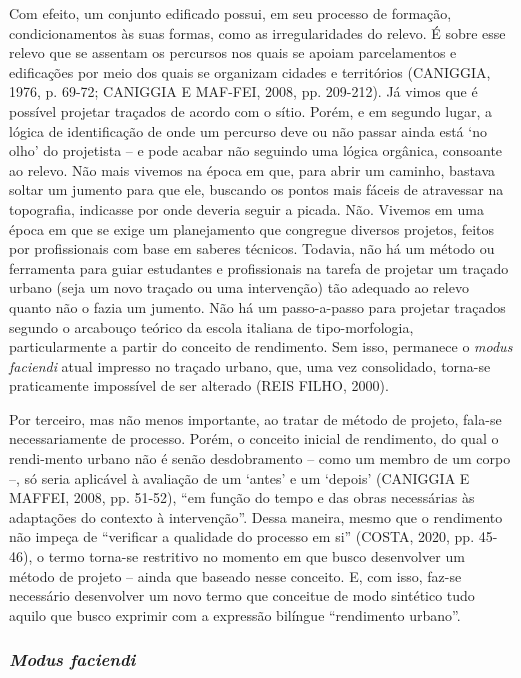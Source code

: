 \documentclass[twoside, 12pt]{book}
\begin{document}
        Com efeito, um conjunto edificado possui, em seu processo de formação, condicionamentos às suas formas, como as irregularidades do relevo. É sobre esse relevo que se assentam os percursos nos quais se apoiam parcelamentos e edificações por meio dos quais se organizam cidades e territórios (CANIGGIA, 1976, p. 69-72; CANIGGIA E MAF-FEI, 2008, pp. 209-212). Já vimos que é possível projetar traçados de acordo com o sítio. Porém, e em segundo lugar, a lógica de identificação de onde um percurso deve ou não passar ainda está ‘no olho’ do projetista – e pode acabar não seguindo uma lógica orgânica, consoante ao relevo. Não mais vivemos na época em que, para abrir um caminho, bastava soltar um jumento para que ele, buscando os pontos mais fáceis de atravessar na topografia, indicasse por onde deveria seguir a picada. Não. Vivemos em uma época em que se exige um planejamento que congregue diversos projetos, feitos por profissionais com base em saberes técnicos. Todavia, não há um método ou ferramenta para guiar estudantes e profissionais na tarefa de projetar um traçado urbano (seja um novo traçado ou uma intervenção) tão adequado ao relevo quanto não o fazia um jumento. Não há um passo-a-passo para projetar traçados segundo o arcabouço teórico da escola italiana de tipo-morfologia, particularmente a partir do conceito de rendimento. Sem isso, permanece o \textit{modus faciendi} atual impresso no traçado urbano, que, uma vez consolidado, torna-se praticamente impossível de ser alterado (REIS FILHO, 2000). 

        Por terceiro, mas não menos importante, ao tratar de método de projeto, fala-se necessariamente de processo. Porém, o conceito inicial de rendimento, do qual o rendi-mento urbano não é senão desdobramento – como um membro de um corpo –, só seria aplicável à avaliação de um ‘antes’ e um ‘depois’ (CANIGGIA E MAFFEI, 2008, pp. 51-52), “em função do tempo e das obras necessárias às adaptações do contexto à intervenção”. Dessa maneira, mesmo que o rendimento não impeça de “verificar a qualidade do processo em si” (COSTA, 2020, pp. 45-46), o termo torna-se restritivo no momento em que busco desenvolver um método de projeto – ainda que baseado nesse conceito. E, com isso, faz-se necessário desenvolver um novo termo que conceitue de modo sintético tudo aquilo que busco exprimir com a expressão bilíngue “rendimento urbano”.

    \subsubsection{\textit{Modus faciendi}}
\end{document}
